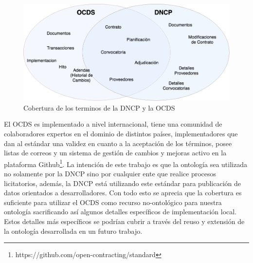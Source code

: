 \begin{figure}[ht!]
    \centering
    \includegraphics[width=150mm]{figuras/Diagramas-VennCobertura.png}
    \caption{Cobertura de los terminos de la DNCP y la OCDS}
    \label{img:coberturaontologia}
\end{figure}

    

El OCDS es implementado a nivel internacional, tiene una comunidad de colaboradores expertos en el dominio de distintos países, implementadores que dan al estándar una validez en cuanto a la aceptación de los términos, posee listas de correos y un sistema de gestión de cambios y mejoras activo en la plataforma Github\footnote{https://github.com/open-contracting/standard}. La intención de este trabajo es que la ontología sea utilizada no solamente por la DNCP sino por cualquier ente que realice procesos licitatorios, además, la DNCP está utilizando este estándar para publicación de datos orientados a desarrolladores. Con todo esto se aprecia que la cobertura es suficiente para utilizar el OCDS como recurso no-ontológico para nuestra ontología sacrificando así algunos detalles específicos de implementación local. Estos detalles más específicos se podrían cubrir a través del reuso y extensión de la ontología desarrollada en un futuro trabajo.
